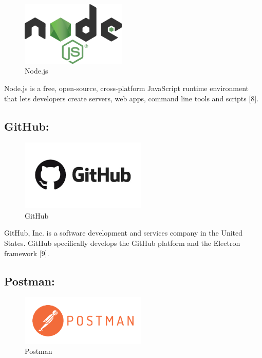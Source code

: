 \newpage
\begin{figure}[!h]
\begin{center}
\includegraphics[width=5cm]{images/Node.png}
\end{center}
\caption{Node.js}
\end{figure}

Node.js is a free, open-source, cross-platform JavaScript runtime environment that lets developers create servers, web apps, command line tools and scripts [8].

\subsection{GitHub:}

\begin{figure}[!h]
\begin{center}
\includegraphics[width=6cm]{images/github.png}
\end{center}
\caption{GitHub}
\end{figure}

GitHub, Inc. is a software development and services company in the United States. GitHub specifically develops the GitHub platform and the Electron framework [9].

\subsection{Postman:}

\begin{figure}[!h]
\begin{center}
\includegraphics[width=6cm]{images/Postman.png}
\end{center}
\caption{Postman}
\end{figure}

